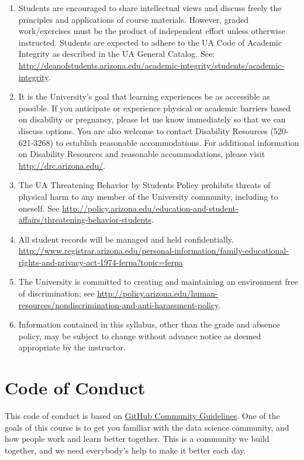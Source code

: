 \documentclass[
]{book}
\begin{document}
\begin{enumerate}
\def\labelenumi{\arabic{enumi}.}
\item
  Students are encouraged to share intellectual views and discuss freely the principles and applications of course materials. However, graded work/exercises must be the product of independent effort unless otherwise instructed. Students are expected to adhere to the UA Code of Academic Integrity as described in the UA General Catalog. See: \url{http://deanofstudents.arizona.edu/academic-integrity/students/academic-integrity}.
\item
  It is the University's goal that learning experiences be as accessible as possible. If you anticipate or experience physical or academic barriers based on disability or pregnancy, please let me know immediately so that we can discuss options. You are also welcome to contact Disability Resources (520-621-3268) to establish reasonable accommodations. For additional information on Disability Resources and reasonable accommodations, please visit \url{http://drc.arizona.edu/}.
\item
  The UA Threatening Behavior by Students Policy prohibits threats of physical harm to any member of the University community, including to oneself. See \url{http://policy.arizona.edu/education-and-student-affairs/threatening-behavior-students}.
\item
  All student records will be managed and held confidentially. \url{http://www.registrar.arizona.edu/personal-information/family-educational-rights-and-privacy-act-1974-ferpa?topic=ferpa}
\item
  The University is committed to creating and maintaining an environment free of discrimination; see \url{http://policy.arizona.edu/human-resources/nondiscrimination-and-anti-harassment-policy}.
\item
  Information contained in this syllabus, other than the grade and absence policy, may be subject to change without advance notice as deemed appropriate by the instructor.
\end{enumerate}

\hypertarget{code-of-conduct}{%
\section{Code of Conduct}\label{code-of-conduct}}

This code of conduct is based on \href{https://docs.github.com/en/github/site-policy/github-community-guidelines}{GitHub Community Guidelines}. One of the goals of this course is to get you familiar with the data science community, and how people work and learn better together. This is a community we build together, and we need everybody's help to make it better each day.
\end{document}
